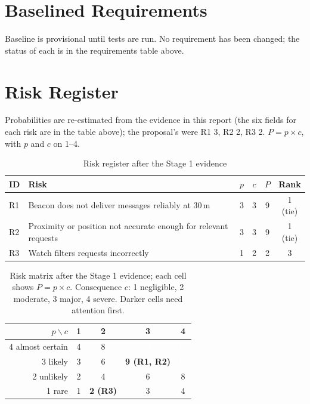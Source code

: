 \IfFileExists{IEEEtran.cls}{\documentclass[conference]{IEEEtran}}{\documentclass[10pt,twocolumn]{article}}
\renewcommand{\arraystretch}{1.1}
\begin{document}
\section{Baselined Requirements}
Baseline is provisional until tests are run. No requirement has been changed; the status of each is in the requirements table above.



\section{Risk Register}\label{sec:risk}
Probabilities are re-estimated from the evidence in this report (the six fields for each risk are in the table above); the proposal's were R1 3, R2 2, R3 2. $P=p\times c$, with $p$ and $c$ on 1--4.



\begin{table}[H]
\caption{Risk register after the Stage 1 evidence}
\centering\footnotesize
\begin{tabularx}{\columnwidth}{@{}l Y c c c c@{}}
\toprule
ID & Risk & $p$ & $c$ & $P$ & Rank\\
\midrule
R1 & Beacon does not deliver messages reliably at 30\,m & 3 & 3 & 9 & 1 (tie)\\
R2 & Proximity or position not accurate enough for relevant requests & 3 & 3 & 9 & 1 (tie)\\
R3 & Watch filters requests incorrectly & 1 & 2 & 2 & 3\\
\bottomrule
\end{tabularx}

\end{table}

\begin{table}[!t]
\caption{Risk matrix after the Stage 1 evidence; each cell shows $P=p\times c$. Consequence $c$: 1 negligible, 2 moderate, 3 major, 4 severe. Darker cells need attention first.}
\centering\footnotesize
\renewcommand{\arraystretch}{1.5}
\begin{tabular}{@{}r|c|c|c|c|@{}}
$p\backslash c$ & 1 & 2 & 3 & 4\\\hline
4 almost certain & \cellcolor{black!10}4 & \cellcolor{black!25}8 & \cellcolor{black!45}\textcolor{white}{12} & \cellcolor{black!65}\textcolor{white}{16}\\\hline
3 likely & \cellcolor{black!10}3 & \cellcolor{black!10}6 & \cellcolor{black!25}\textbf{9 (R1, R2)} & \cellcolor{black!45}\textcolor{white}{12}\\\hline
2 unlikely & 2 & \cellcolor{black!10}4 & 6 & \cellcolor{black!25}8\\\hline
1 rare & 1 & \textbf{2 (R3)} & 3 & \cellcolor{black!10}4\\\hline
\end{tabular}
\end{table}
\end{document}
